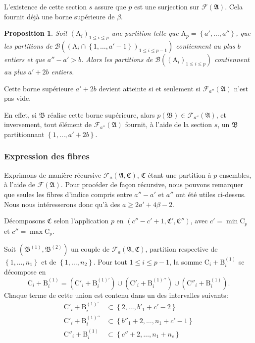 \documentclass[11pt, oneside]{article}   	%
\newcommand{\interval}[2]{\left\{ #1, \dots, #2 \right\}}
\newtheorem{proposition}{Proposition}
\begin{document}
L'existence de cette section $s$ assure que $p$ est une surjection sur $\mathcal{F}(\mathfrak{A})$.
Cela fournit déjà une borne supérieure de $\beta$.

\begin{proposition}
Soit $(\mathrm{A}_i)_{1 \leqslant i \leqslant p}$ une partition telle que $\mathrm{A}_p = \interval{a'}{a''}$,
que les partitions de $\mathcal{B}((\mathrm{A}_i \cap \interval{1}{a'-1})_{1 \leqslant i \leqslant p-1})$ contiennent au plus $b$ entiers
et que $a'' - a' > b$.
Alors les partitions de $\mathcal{B}((\mathrm{A}_i)_{1 \leqslant i \leqslant p})$ contiennent au plus $a' + 2b$ entiers.
\end{proposition}

Cette borne supérieure $a' + 2b$ devient atteinte si et seulement si $\mathcal{F}_{a''}(\mathfrak{A})$ n'est pas vide.

En effet, si $\mathfrak{B}$ réalise cette borne supérieure, alors $p(\mathfrak{B}) \in \mathcal{F}_{a''}(\mathfrak{A})$,
et inversement, tout élément de $\mathcal{F}_{a''}(\mathfrak{A})$ fournit, à l'aide de la section $s$, un $\mathfrak{B}$ partitionnant $\interval{1}{a' + 2b}$.

\subsubsection{Expression des fibres}

Exprimons de manière récursive $\mathcal{F}_a(\mathfrak{A}, \mathfrak{C})$, $\mathfrak{C}$ étant une partition à $p$ ensembles,
à l'aide de $\mathcal{F}(\mathfrak{A})$.
Pour procéder de façon récursive, nous pouvons remarquer que seules les fibres d'indice compris entre $a'' - a'$ et $a''$ ont été utiles ci-dessus.
Nous nous intéresserons donc qu'à des $a \geqslant 2 a' + 4 \beta - 2$.

Décomposons $\mathfrak{C}$ selon l'application $p$ en $(c'' - c' + 1, \mathfrak{C}', \mathfrak{C}'')$,
avec $c' = \min \mathrm{C}_p$ et $c'' = \max \mathrm{C}_p$.

Soit $(\mathfrak{B}^{(1)}, \mathfrak{B}^{(2)})$ un couple de $\mathcal{F}_a(\mathfrak{A}, \mathfrak{C})$,
partition respective de $\interval{1}{n_1}$ et de $\interval{1}{n_2}$.
Pour tout $1 \leqslant i \leqslant p-1$, la somme $\mathrm{C}_i + \mathrm{B}_i^{(1)}$ se décompose en
\begin{equation}
 \mathrm{C}_i + \mathrm{B}_i^{(1)} = \left( \mathrm{C}'_i + \mathrm{B}_i^{(1)\prime} \right) \cup \left( \mathrm{C}'_i + \mathrm{B}_i^{(1)\prime\prime} \right)
 \cup \left( \mathrm{C}''_i + \mathrm{B}_i^{(1)} \right) .
\end{equation}
Chaque terme de cette union est contenu dans un des intervalles suivants:
\begin{align}
 \mathrm{C}'_i + \mathrm{B}_i^{(1)\prime} & \subset \interval{2}{b'_1 + c' - 2} \\
 \mathrm{C}'_i + \mathrm{B}_i^{(1)\prime\prime} & \subset \interval{b''_1 + 2}{n_1 + c' - 1} \\
 \mathrm{C}''_i + \mathrm{B}_i^{(1)} & \subset \interval{c'' + 2}{n_1 + n_c}
\end{align}
\end{document}
